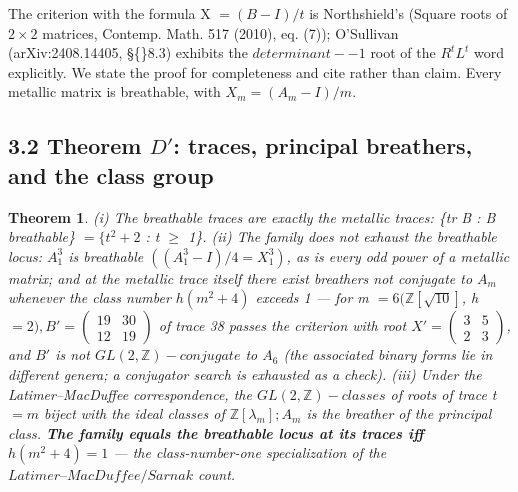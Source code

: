 \documentclass[11pt]{article}
\theoremstyle{plain}
\newtheorem{theorem}{Theorem}[section]
\theoremstyle{definition}
\theoremstyle{remark}
\begin{document}
The criterion with the formula X \(= (B - I)/t\) is Northshield's (Square roots of \(2\times 2\) matrices, Contemp. Math. 517 (2010), eq. (7)); O'Sullivan (arXiv:2408.14405, \S\{\}8.3) exhibits the \(determinant--1\) root of the \(R^{t}L^{t}\) word explicitly. We state the proof for completeness and cite rather than claim. Every metallic matrix is breathable, with \(X_{m} = (A_{m} - I)/m\).

\subsection{3.2 Theorem \(D\prime \): traces, principal breathers, and the class group}

\begin{theorem}
(i) The breathable traces are exactly the metallic traces: \{tr B : B breathable\} \(= \{t^{2} + 2\) : t \(\ge \) 1\}. (ii) The family does not exhaust the breathable locus: \(A_{1}^{3}\) is breathable \(((A_{1}^{3} - I)/4 = X_{1}^{3})\), as is every odd power of a metallic matrix; and at the metallic trace itself there exist breathers not conjugate to \(A_{m}\) whenever the class number \(h(m^{2}+4)\) exceeds 1 — for m \(= 6 (\mathbb{Z}[\sqrt{10}]\), h \(= 2), B\prime  = \left(\begin{smallmatrix}19 & 30\\12 & 19\end{smallmatrix}\right)\) of trace 38 passes the criterion with root \(X\prime  = \left(\begin{smallmatrix}3 & 5\\2 & 3\end{smallmatrix}\right)\), and \(B\prime \) is not \(GL(2,\mathbb{Z})-conjugate\) to \(A_{6}\) (the associated binary forms lie in different genera; a conjugator search is exhausted as a check). (iii) Under the Latimer–MacDuffee correspondence, the \(GL(2,\mathbb{Z})-classes\) of roots of trace t \(= m\) biject with the ideal classes of \(\mathbb{Z}[\lambda _{m}]; A_{m}\) is the breather of the principal class. \textbf{The family equals the breathable locus at its traces iff \(h(m^{2}+4) = 1\)} — the class-number-one specialization of the \(Latimer–MacDuffee/Sarnak\) count.
\end{theorem}
\end{document}
